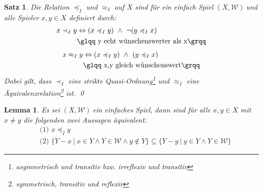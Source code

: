 \documentclass[ngerman]{scrartcl}
\theoremstyle{custom}
\newtheorem{ms}[mdef]{Satz}
\newtheorem{ml}[mdef]{Lemma}
\newcommand{\0}{\mathbf{0}}
\newcommand{\1}{\mathbf{L}}
\newcommand{\sg}{$(X,\mathcal{W})~$}
\newcommand{\W}{\mathcal{W}}
\newcommand{\ww}{\preccurlyeq _{I}}
\begin{document}
\begin{ms}
Die Relation $\ww$ und $\approx_I$ auf $X$ sind f\"ur ein einfach
Spiel \sg und alle Spieler $x,y \in X$ definiert durch:
\begin{align*}
x \prec_I y &\Leftrightarrow (x \ww y) ~\wedge~ \neg(y \ww x)\\
& \text{\glqq y echt w\"unschenswerter als x\grqq} 
\end{align*}
\begin{align*}
x \approx_I y &\Leftrightarrow (x \ww y) ~\wedge~ (y \ww x)\\
& \text{\glqq x,y gleich w\"unschenswert\grqq} 
\end{align*}
Dabei gilt, dass $\prec_I$ eine strikte
Quasi-Ordnung\footnote{asymmetrisch und transitiv bzw. irreflexiv und
  transitiv} und $\approx_I$ eine
\"Aquivalenzrelation\footnote{symmetrisch, transitiv und reflexiv}
ist.
\qed
\end{ms}

\begin{ml}
Es sei \sg ein einfaches Spiel, dann sind f\"ur alle $x,y \in X$ mit
$x \not = y$ die folgenden zwei Aussagen \"aquivalent:
\begin{align*}
&\text{ (1) } x \ww y\\
&\text{ (2) } \{Y-x ~\vert~ x \in Y \wedge Y \in \W \wedge y \not \in
Y\} \subseteq \{Y-y ~\vert~ y \in Y \wedge Y \in \W\}
\end{align*}
\end{ml}
\end{document}
